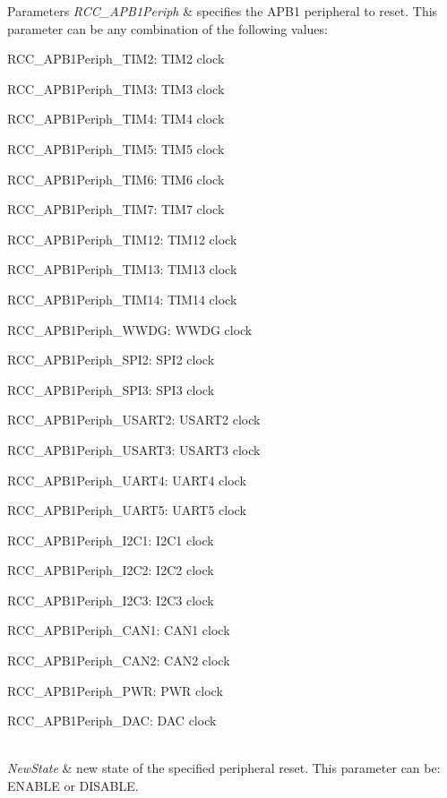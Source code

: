 \begin{DoxyParams}{Parameters}
{\em R\+C\+C\+\_\+\+A\+P\+B1\+Periph} & specifies the A\+P\+B1 peripheral to reset. This parameter can be any combination of the following values\+: \begin{DoxyItemize}
\item R\+C\+C\+\_\+\+A\+P\+B1\+Periph\+\_\+\+T\+I\+M2\+: T\+I\+M2 clock \item R\+C\+C\+\_\+\+A\+P\+B1\+Periph\+\_\+\+T\+I\+M3\+: T\+I\+M3 clock \item R\+C\+C\+\_\+\+A\+P\+B1\+Periph\+\_\+\+T\+I\+M4\+: T\+I\+M4 clock \item R\+C\+C\+\_\+\+A\+P\+B1\+Periph\+\_\+\+T\+I\+M5\+: T\+I\+M5 clock \item R\+C\+C\+\_\+\+A\+P\+B1\+Periph\+\_\+\+T\+I\+M6\+: T\+I\+M6 clock \item R\+C\+C\+\_\+\+A\+P\+B1\+Periph\+\_\+\+T\+I\+M7\+: T\+I\+M7 clock \item R\+C\+C\+\_\+\+A\+P\+B1\+Periph\+\_\+\+T\+I\+M12\+: T\+I\+M12 clock \item R\+C\+C\+\_\+\+A\+P\+B1\+Periph\+\_\+\+T\+I\+M13\+: T\+I\+M13 clock \item R\+C\+C\+\_\+\+A\+P\+B1\+Periph\+\_\+\+T\+I\+M14\+: T\+I\+M14 clock \item R\+C\+C\+\_\+\+A\+P\+B1\+Periph\+\_\+\+W\+W\+DG\+: W\+W\+DG clock \item R\+C\+C\+\_\+\+A\+P\+B1\+Periph\+\_\+\+S\+P\+I2\+: S\+P\+I2 clock \item R\+C\+C\+\_\+\+A\+P\+B1\+Periph\+\_\+\+S\+P\+I3\+: S\+P\+I3 clock \item R\+C\+C\+\_\+\+A\+P\+B1\+Periph\+\_\+\+U\+S\+A\+R\+T2\+: U\+S\+A\+R\+T2 clock \item R\+C\+C\+\_\+\+A\+P\+B1\+Periph\+\_\+\+U\+S\+A\+R\+T3\+: U\+S\+A\+R\+T3 clock \item R\+C\+C\+\_\+\+A\+P\+B1\+Periph\+\_\+\+U\+A\+R\+T4\+: U\+A\+R\+T4 clock \item R\+C\+C\+\_\+\+A\+P\+B1\+Periph\+\_\+\+U\+A\+R\+T5\+: U\+A\+R\+T5 clock \item R\+C\+C\+\_\+\+A\+P\+B1\+Periph\+\_\+\+I2\+C1\+: I2\+C1 clock \item R\+C\+C\+\_\+\+A\+P\+B1\+Periph\+\_\+\+I2\+C2\+: I2\+C2 clock \item R\+C\+C\+\_\+\+A\+P\+B1\+Periph\+\_\+\+I2\+C3\+: I2\+C3 clock \item R\+C\+C\+\_\+\+A\+P\+B1\+Periph\+\_\+\+C\+A\+N1\+: C\+A\+N1 clock \item R\+C\+C\+\_\+\+A\+P\+B1\+Periph\+\_\+\+C\+A\+N2\+: C\+A\+N2 clock \item R\+C\+C\+\_\+\+A\+P\+B1\+Periph\+\_\+\+P\+WR\+: P\+WR clock \item R\+C\+C\+\_\+\+A\+P\+B1\+Periph\+\_\+\+D\+AC\+: D\+AC clock \end{DoxyItemize}
\\
\hline
{\em New\+State} & new state of the specified peripheral reset. This parameter can be\+: E\+N\+A\+B\+LE or D\+I\+S\+A\+B\+LE. \\
\hline
\end{DoxyParams}

